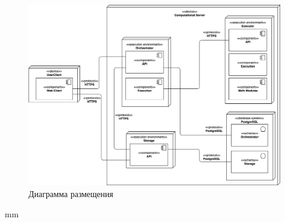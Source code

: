 \begin{figure}[H]
	\hspace*{-2.5 cm}\includegraphics[width=\textwidth, left]{architecture/pictures/deployment_diagram}
	\caption{Диаграмма размещения}
	\label{pic:architecture__deployment-diagram}
\end{figure}
 mm

